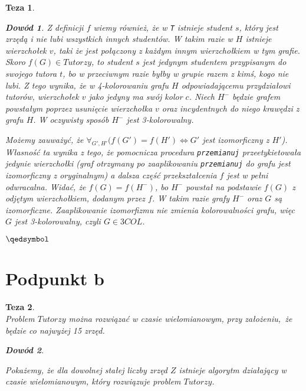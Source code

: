 \documentclass[12pt]{article}
\newtheorem*{theorem*}{Teza}
\newtheorem*{proof*}{Dowód}
\begin{document}
\begin{titlepage}
\begin{theorem*}
\begin{proof*}
Z definicji $f$ wiemy również, że w \texttt{T} istnieje student $s$, który jest \textit{zrzędą} i nie lubi wszystkich innych studentów. W takim razie w $H$ istnieje wierzchołek $v$, taki że jest połączony z każdym innym wierzchołkiem w tym grafie. Skoro $f(G) \in Tutorzy$, to student $s$ jest jedynym studentem przypisanym do swojego tutora $t$, bo w przeciwnym razie byłby w grupie razem z kimś, kogo nie lubi. Z tego wynika, że w 4-kolorowaniu grafu $H$ odpowiadającemu przydziałowi tutorów, wierzchołek $v$ jako jedyny ma swój kolor $c$. Niech $H^-$ będzie grafem powstałym poprzez usunięcie wierzchołka $v$ oraz incydentnych do niego krawędzi z grafu $H$. W oczywisty sposób $H^-$ jest 3-kolorowalny.

Możemy zauważyć, że $\forall_{G', H'}(f(G') = f(H') \Leftrightarrow G'$ jest 
izomorficzny z $H'$). Własność ta wynika z tego, że pomocnicza procedura 
\texttt{przemianuj} przeetykietowała jedynie wierzchołki (graf otrzymany po 
zaaplikowaniu \texttt{przemianuj} do grafu jest izomorficzny z oryginalnym) a 
dalsza część przekształcenia $f$ jest w pełni odwracalna. Widać, że $f(G) 
= f(H^-)$, bo $H^-$ powstał na podstawie $f(G)$ z odjętym wierzchołkiem, 
dodanym przez $f$. W takim razie grafy $H^-$ oraz $G$ są izomorficzne. 
Zaaplikowanie izomorfizmu nie zmienia kolorowalności grafu, więc 
$G$ jest 3-kolorowalny, czyli $G \in 3COL$.
\begin{flushright}
    $\qedsymbol$
\end{flushright}

\end{proof*} \end{theorem*}

\hrulefill

\section{Podpunkt b}

\begin{theorem*}\,\\\normalfont
Problem $Tutorzy$ można rozwiązać w czasie wielomianowym, przy założeniu, że 
będzie co najwyżej 15 zrzęd.

\begin{proof*}\,\\\normalfont

Pokażemy, że dla dowolnej stałej liczby zrzęd $Z$ istnieje algorytm działający 
w czasie wielomianowym, który rozwiązuje problem $Tutorzy$.





\end{proof*} \end{theorem*}

\end{titlepage}
\end{document}
